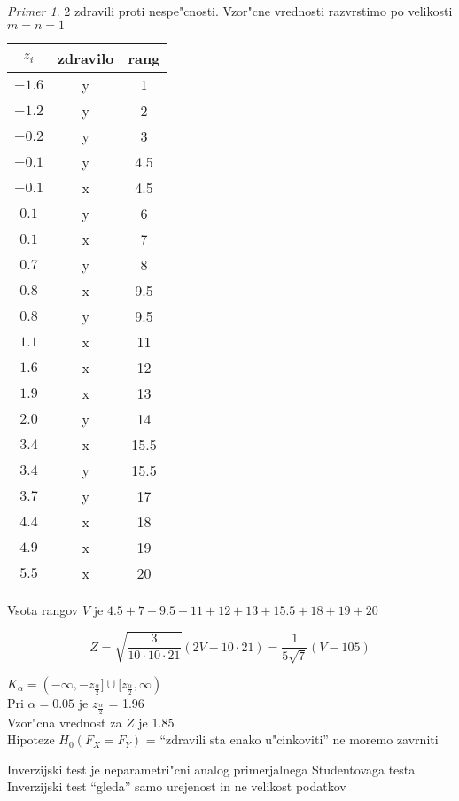 \documentclass[a4paper,12pt]{article}
\theoremstyle{definition}
\theoremstyle{remark}
\newtheorem*{ex}{Primer}
\begin{document}
\begin{ex}
    2 zdravili proti nespe"cnosti. Vzor"cne vrednosti razvrstimo po velikosti $m=n=1$

    \begin{center}
        \begin{tabular}{c | c | c} 
            $z_i$ & zdravilo & rang \\
            \hline
            $-1.6$ & y & 1 \\
            $-1.2$ & y & 2 \\
            $-0.2$ & y & 3 \\
            $-0.1$ & y & 4.5 \\
            $-0.1$ & x & 4.5 \\
            $0.1$ & y & 6 \\
            $0.1$ & x & 7 \\
            $0.7$ & y & 8 \\
            $0.8$ & x & 9.5 \\
            $0.8$ & y & 9.5 \\
            $1.1$ & x & 11 \\
            $1.6$ & x & 12 \\
            $1.9$ & x & 13 \\
            $2.0$ & y & 14 \\
            $3.4$ & x & 15.5 \\
            $3.4$ & y & 15.5 \\
            $3.7$ & y & 17 \\
            $4.4$ & x & 18 \\
            $4.9$ & x & 19 \\
            $5.5$ & x & 20
        \end{tabular}
    \end{center}

    Vsota rangov $V$ je $4.5 + 7 + 9.5 + 11 + 12 + 13 + 15.5 + 18 + 19 + 20$

    \begin{equation*}
        Z = \sqrt{\frac{3}{10 \cdot 10 \cdot 21}} (2V - 10 \cdot 21) = \frac{1}{5 \sqrt{7}} (V - 105)
    \end{equation*}


    $K_{\alpha} = (-\infty, -z_{\frac{\alpha}{2}}] \cup [z_{\frac{\alpha}{2}}, \infty)$ \\
    Pri $\alpha = 0.05$ je $z_{\frac{\alpha}{2}}$ = 1.96 \\
    Vzor"cna vrednost za $Z$ je 1.85 \\
    Hipoteze $H_0(F_X = F_Y)$ = ``zdravili sta enako u"cinkoviti'' ne moremo zavrniti
\end{ex}

Inverzijski test je neparametri"cni analog primerjalnega Studentovaga testa \\
Inverzijski test ``gleda'' samo urejenost in ne velikost podatkov
\end{document}
